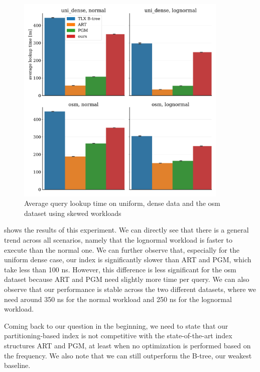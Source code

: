 \begin{figure}[!ht]
    \centering
    \includegraphics[width=0.9\textwidth]{figures/exp2_times.pdf}
    \caption[uni and osm lookup performance after normal and lognormal sampling]{Average query lookup time on uniform, dense data and the osm dataset using skewed workloads}
    \label{fig:skewedtimes}
\end{figure}


 shows the results of this experiment. We can directly see that there is a general trend across all scenarios, namely that the lognormal workload is faster to execute than the normal one. We can further observe that, especially for the uniform dense case, our index is significantly slower than ART and PGM, which take less than 100 ns. However, this difference is less significant for the osm dataset because ART and PGM need slightly more time per query. We can also observe that our performance is stable across the two different datasets, where we need around 350 ns for the normal workload and 250 ns for the lognormal workload.

Coming back to our question in the beginning, we need to state that our partitioning-based index is not competitive with the state-of-the-art index structures ART and PGM, at least when no optimization is performed based on the frequency. We also note that we can still outperform the B-tree, our weakest baseline.



